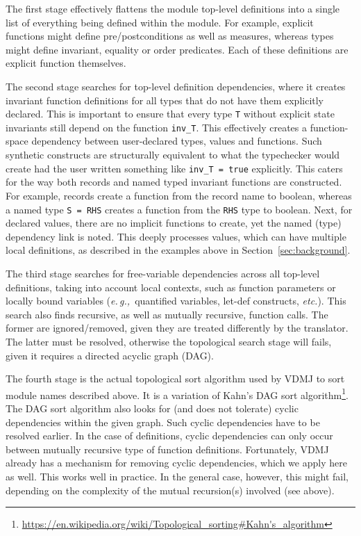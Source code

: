 \documentclass[runningheads,a4paper]{llncs}
\newcommand{\eg}{{\em e.\,g.,\/}}
\newcommand{\etc}{{\em etc.\/}}
\begin{document}
%
The first stage effectively flattens the module top-level definitions into a single list of everything being defined within the module. For example, explicit functions might define pre/postconditions as well as measures, whereas types might define invariant, equality or order predicates. Each of these definitions are explicit function themselves. 

The second stage searches for top-level definition dependencies, where it creates invariant function definitions for all types that do not have them explicitly declared. This is important to ensure that every type \verb'T' without explicit state invariants still depend on the function \verb'inv_T'. This effectively creates a function-space dependency between user-declared types, values and functions. Such synthetic constructs are structurally equivalent to what the typechecker would create had the user written something like \verb'inv_T = true' explicitly. This caters for the way both records and named typed invariant functions are constructed. For example, records create a function from the record name to boolean, whereas a named type \verb'S = RHS' creates a function from the \verb'RHS' type to boolean. Next, for declared values, there are no implicit functions to create, yet the named (type) dependency link is noted. This deeply processes values, which can have multiple local definitions, as described in the examples above in Section~\ref{sec:background}.    

The third stage searches for free-variable dependencies across all top-level definitions, taking into account local contexts, such as function parameters or locally bound variables (\eg~quantified variables, let-def constructs, \etc). This search also finds recursive, as well as mutually recursive, function calls. The former are ignored/removed, given they are treated differently by the translator. The latter must be resolved, otherwise the topological search stage will fails, given it requires a directed acyclic graph (DAG).    

The fourth stage is the actual topological sort algorithm used by VDMJ to sort module names described above. It is a variation of Kahn's DAG sort algorithm\footnote{\url{https://en.wikipedia.org/wiki/Topological_sorting\#Kahn's_algorithm}}. The DAG sort algorithm also looks for (and does not tolerate) cyclic dependencies within the given graph. Such cyclic dependencies have to be resolved earlier. In the case of definitions, cyclic dependencies can only occur between mutually recursive type of function definitions. Fortunately, VDMJ already has a mechanism for removing cyclic dependencies, which we apply here as well. This works well in practice. In the general case, however, this might fail, depending on the complexity of the mutual recursion(s) involved (see above).
\end{document}
